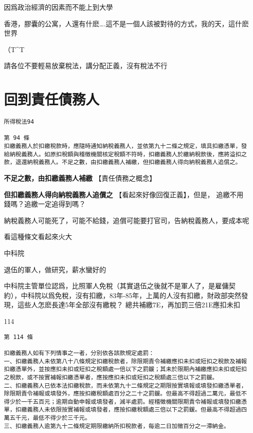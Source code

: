 \documentclass[]{ctexbook}
\begin{document}
因爲政治經濟的因素而不能上到大學

香港，膠囊的公寓，人還有什麽\ldots.這不是一個人該被對待的方式，我的天，這什麽世界

（T\^{}T

請各位不要輕易放棄稅法，講分配正義，沒有稅法不行

\hypertarget{ux56deux5230ux8cacux4efbux50b5ux52d9ux4eba}{%
\section{回到責任債務人}\label{ux56deux5230ux8cacux4efbux50b5ux52d9ux4eba}}

\begin{verbatim}
所得稅法94

第 94 條
扣繳義務人於扣繳稅款時，應隨時通知納稅義務人，並依第九十二條之規定，填具扣繳憑單，發給納稅義務人。如原扣稅額與稽徵機關核定稅額不符時，扣繳義務人於繳納稅款後，應將溢扣之款，退還納稅義務人。不足之數，由扣繳義務人補繳，但扣繳義務人得向納稅義務人追償之。
\end{verbatim}

\textbf{不足之數，由扣繳義務人補繳}
【責任債務之概念】

\textbf{但扣繳義務人得向納稅義務人追償之}
【看起來好像回復正義】，但是，
追繳不用錢嗎？追繳一定追得到嗎？

納稅義務人可能死了，可能不給錢，追償可能要打官司，告納稅義務人，要成本呢

看這種條文看起來火大

中科院

退伍的軍人，做研究，薪水蠻好的

中科院主管單位認爲，比照軍人免稅（其實退伍之後就不是軍人了，是雇傭契約），中科院以爲免稅，沒有扣繳，83年-85年，上萬的人沒有扣繳，財政部突然發現，這些人怎麽長達5年全部沒有繳稅？
總共補繳7E，再加罰三倍21E應扣未扣

114

\begin{verbatim}
第 114 條

扣繳義務人如有下列情事之一者，分別依各該款規定處罰：
一、扣繳義務人未依第八十八條規定扣繳稅款者，除限期責令補繳應扣未扣或短扣之稅款及補報扣繳憑單外，並按應扣未扣或短扣之稅額處一倍以下之罰鍰；其未於限期內補繳應扣未扣或短扣之稅款，或不按實補報扣繳憑單者，應按應扣未扣或短扣之稅額處三倍以下之罰鍰。
二、扣繳義務人已依本法扣繳稅款，而未依第九十二條規定之期限按實填報或填發扣繳憑單者，除限期責令補報或填發外，應按扣繳稅額處百分之二十之罰鍰。但最高不得超過二萬元，最低不得少於一千五百元；逾期自動申報或填發者，減半處罰。經稽徵機關限期責令補報或填發扣繳憑單，扣繳義務人未依限按實補報或填發者，應按扣繳稅額處三倍以下之罰鍰。但最高不得超過四萬五千元，最低不得少於三千元。
三、扣繳義務人逾第九十二條規定期限繳納所扣稅款者，每逾二日加徵百分之一滯納金。
\end{verbatim}
\end{document}

